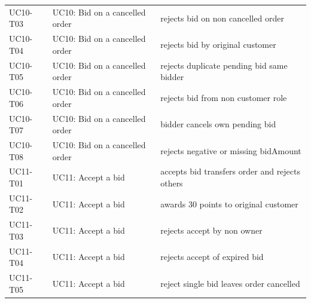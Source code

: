 \begin{table}[t]
\begin{tabular}{p{3.2cm}p{4.0cm}p{5.8cm}}
UC10-T03 & UC10: Bid on a cancelled order & rejects bid on non cancelled order \\
UC10-T04 & UC10: Bid on a cancelled order & rejects bid by original customer \\
UC10-T05 & UC10: Bid on a cancelled order & rejects duplicate pending bid same bidder \\
UC10-T06 & UC10: Bid on a cancelled order & rejects bid from non customer role \\
UC10-T07 & UC10: Bid on a cancelled order & bidder cancels own pending bid \\
UC10-T08 & UC10: Bid on a cancelled order & rejects negative or missing bidAmount \\
UC11-T01 & UC11: Accept a bid & accepts bid transfers order and rejects others \\
UC11-T02 & UC11: Accept a bid & awards 30 points to original customer \\
UC11-T03 & UC11: Accept a bid & rejects accept by non owner \\
UC11-T04 & UC11: Accept a bid & rejects accept of expired bid \\
UC11-T05 & UC11: Accept a bid & reject single bid leaves order cancelled \\
\bottomrule
\end{tabular}
\end{table}

